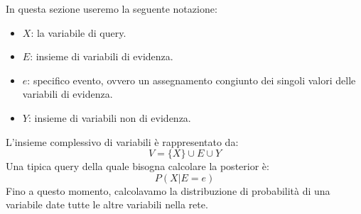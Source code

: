 In questa sezione useremo la seguente notazione:
\begin{itemize}
    \item $X$: la variabile di query.
    \item $E$: insieme di variabili di evidenza.
    \item $e$: specifico evento, ovvero un assegnamento congiunto dei singoli
          valori delle variabili di evidenza.
    \item $Y$: insieme di variabili non di evidenza.
\end{itemize}
L'insieme complessivo di variabili è rappresentato da:
\begin{equation*}
    V = \{X\} \cup E \cup Y
\end{equation*}
Una tipica query della quale bisogna calcolare la posterior è:
\begin{equation*}
    P(X|E=e)
\end{equation*}
Fino a questo momento, calcolavamo la distribuzione di probabilità di una
variabile date tutte le altre variabili nella rete.

